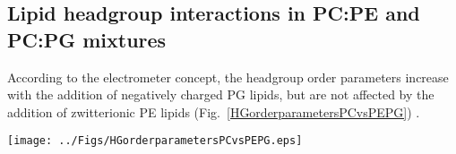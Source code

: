 \documentclass[aps,prl,superscriptaddress,twocolumn]{revtex4}
\begin{document}
\subsection{Lipid headgroup interactions in PC:PE and PC:PG mixtures}
According to the electrometer concept, the headgroup order parameters increase
with the addition of negatively charged PG lipids, but
are not affected by the addition of zwitterionic PE lipids (Fig.~\ref{HGorderparametersPCvsPEPG}) \cite{seelig87, scherer87}. %
\begin{figure*}[]
  \centering
  \texttt{[image: ../Figs/HGorderparametersPCvsPEPG.eps]}
  \caption{\label{HGorderparametersPCvsPEPG}
    Modulation of PC headgroup order parameters with increasing amount of PE (left) and PG (right) in bilayer
    from experiments \cite{scherer87,macdonald87} and simulations with different force fields.
    Signs are determined as discussed in \cite{botan15,ollila16}.
  }
\end{figure*}
\end{document}
